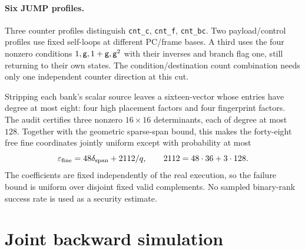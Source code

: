 \documentclass[11pt]{article}
\begin{document}
\paragraph{Six JUMP profiles.} Three counter profiles distinguish \texttt{cnt\_c}, \texttt{cnt\_f}, \texttt{cnt\_bc}. Two payload/control profiles use fixed self-loops at different PC/frame bases. A third uses the four nonzero conditions $1,\mathsf{g},1+\mathsf{g},\mathsf{g}^2$ with their inverses and branch flag one, still returning to their own states. The condition/destination count combination needs only one independent counter direction at this cut.

Stripping each bank's scalar source leaves a sixteen-vector whose entries have degree at most eight: four high placement factors and four fingerprint factors. The audit certifies three nonzero $16\times16$ determinants, each of degree at most $128$. Together with the geometric sparse-span bound, this makes the forty-eight free fine coordinates jointly uniform except with probability at most
\[
 \varepsilon_{\rm fine}=48\delta_{\rm span}+2112/q,
 \qquad 2112=48\cdot36+3\cdot128.
\]
The coefficients are fixed independently of the real execution, so the failure bound is uniform over disjoint fixed valid complements. No sampled binary-rank success rate is used as a security estimate.

\section{Joint backward simulation}
\end{document}
